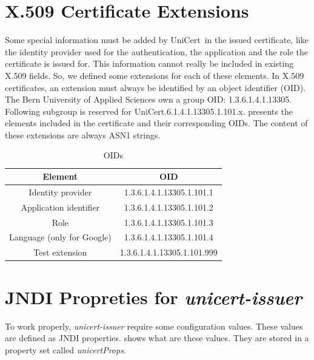 \documentclass[oneside]{scrreprt}
\newcommand{\unicert}{\mbox{UniCert}}
\begin{document}
\section{X.509 Certificate Extensions}

Some special information must be added by \unicert\ in the issued certificate, like the identity provider used for the authentication, the application and the role the certificate is issued for. This information cannot really be included in existing X.509 fields. So, we defined some extensions for each of these elements. In X.509 certificates, an extension must always be identified by an object identifier (OID). The Bern University of Applied Sciences own a group OID: 1.3.6.1.4.1.13305. Following subgroup is reserved for \unicert{}.6.1.4.1.13305.1.101.x.  presents the elements included in the certificate and their corresponding OIDs. The content of these extensions are always ASN1 strings.


\begin{table}[ht]

\centering
\begin{tabular}{|c|c|}
  \hline
  Element & OID\\
  \hline
  Identity provider & 1.3.6.1.4.1.13305.1.101.1 \\
  Application identifier & 1.3.6.1.4.1.13305.1.101.2 \\
  Role & 1.3.6.1.4.1.13305.1.101.3 \\
  Language (only for Google) & 1.3.6.1.4.1.13305.1.101.4 \\
  Test extension & 1.3.6.1.4.1.13305.1.101.999 \\
  \hline
\end{tabular}
\caption{OIDs}
\label{t:oids}
\end{table}

\section{JNDI Propreties for \textit{unicert-issuer}}

To work properly, \textit{unicert-issuer} require some configuration values. These values are defined as JNDI properties.  shows what are these values. They are stored in a property set called \textit{unicertProps}.
\end{document}
